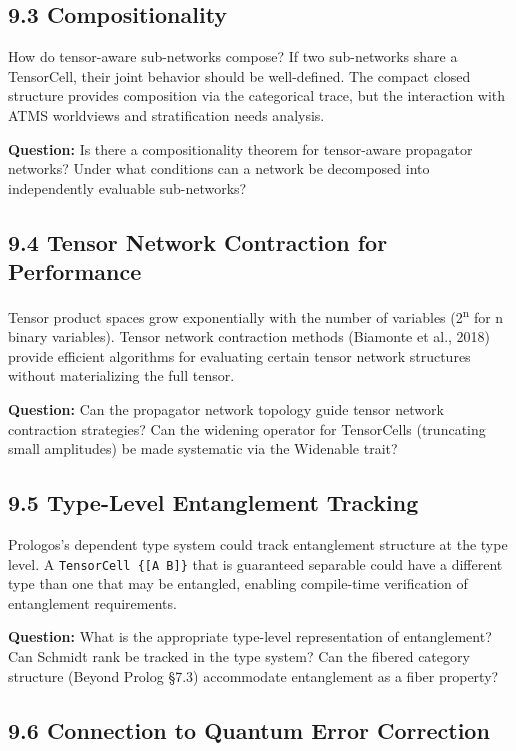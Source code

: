 \documentclass[11pt]{article}
\begin{document}
\subsection{9.3 Compositionality}
\label{sec:org5659c5e}

How do tensor-aware sub-networks compose? If two sub-networks share a TensorCell,
their joint behavior should be well-defined. The compact closed structure provides
composition via the categorical trace, but the interaction with ATMS worldviews
and stratification needs analysis.

\textbf{Question:} Is there a compositionality theorem for tensor-aware propagator
networks? Under what conditions can a network be decomposed into independently
evaluable sub-networks?
\subsection{9.4 Tensor Network Contraction for Performance}
\label{sec:org9048f3b}

Tensor product spaces grow exponentially with the number of variables (2\textsuperscript{n} for
n binary variables). Tensor network contraction methods (Biamonte et al., 2018)
provide efficient algorithms for evaluating certain tensor network structures
without materializing the full tensor.

\textbf{Question:} Can the propagator network topology guide tensor network contraction
strategies? Can the widening operator for TensorCells (truncating small
amplitudes) be made systematic via the Widenable trait?
\subsection{9.5 Type-Level Entanglement Tracking}
\label{sec:orge00995f}

Prologos's dependent type system could track entanglement structure at the type
level. A \texttt{TensorCell \{[A B]\}} that is guaranteed separable could have a
different type than one that may be entangled, enabling compile-time verification
of entanglement requirements.

\textbf{Question:} What is the appropriate type-level representation of entanglement?
Can Schmidt rank be tracked in the type system? Can the fibered category
structure (Beyond Prolog §7.3) accommodate entanglement as a fiber property?
\subsection{9.6 Connection to Quantum Error Correction}
\label{sec:orgf254c5f}
\end{document}

